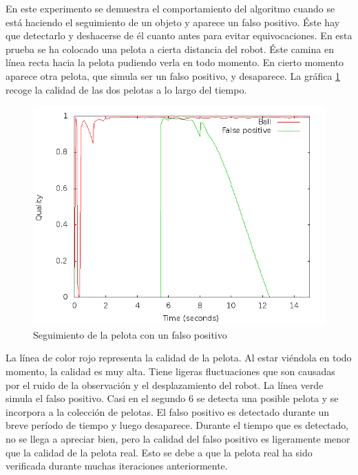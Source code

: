 En este experimento se demuestra el comportamiento del algoritmo cuando se está haciendo el seguimiento de un objeto y aparece un falso positivo. Éste hay que detectarlo y deshacerse de él cuanto antes para evitar equivocaciones. En esta prueba se ha colocado una pelota a cierta distancia del robot. Éste camina en línea recta hacia la pelota pudiendo verla en todo momento. En cierto momento aparece otra pelota, que simula ser un falso positivo, y desaparece. La gráfica \ref{fig:falsos_positivos} recoge la calidad de las dos pelotas a lo largo del tiempo. \\

\begin{figure} [h]
  \begin{center}
    \includegraphics[width=13cm]{img/cap5/falsos_positivos}
  \end{center}
  \caption{Seguimiento de la pelota con un falso positivo}
  \label{fig:falsos_positivos}
\end{figure}

La línea de color rojo representa la calidad de la pelota. Al estar viéndola en todo momento, la calidad es muy alta. Tiene ligeras fluctuaciones que son causadas por el ruido de la observación y el desplazamiento del robot. La línea verde simula el falso positivo. Casi en el segundo 6 se detecta una posible pelota y se incorpora a la colección de pelotas. El falso positivo es detectado durante un breve período de tiempo y luego desaparece. Durante el tiempo que es detectado, no se llega a apreciar bien, pero la calidad del falso positivo es ligeramente menor que la calidad de la pelota real. Esto se debe a que la pelota real ha sido verificada durante muchas iteraciones anteriormente. \\

